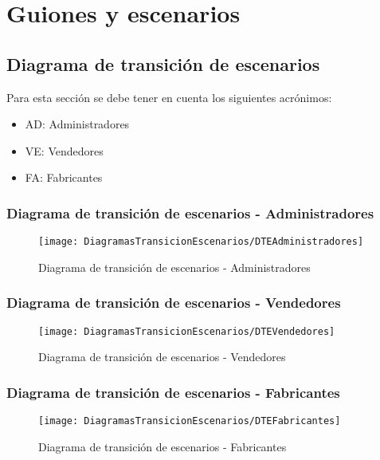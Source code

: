\section{Guiones y escenarios}
\subsection{Diagrama de transición de escenarios}
Para esta sección se debe tener en cuenta los siguientes acrónimos:
\begin{itemize}
    \item AD: Administradores
    \item VE: Vendedores
    \item FA: Fabricantes
\end{itemize}
\subsubsection{Diagrama de transición de escenarios - Administradores}
    \begin{figure}[H]
        \centering
        \texttt{[image: DiagramasTransicionEscenarios/DTEAdministradores]}
        \caption{Diagrama de transición de escenarios - Administradores}
    \label{fig:DTEAdministradores}
\end{figure}
\subsubsection{Diagrama de transición de escenarios - Vendedores}
\begin{figure}[H]
    \centering
    \texttt{[image: DiagramasTransicionEscenarios/DTEVendedores]}
    \caption{Diagrama de transición de escenarios - Vendedores}
\label{fig:DTEVendedores}
\end{figure}
\subsubsection{Diagrama de transición de escenarios - Fabricantes}
\begin{figure}[H]
    \centering
    \texttt{[image: DiagramasTransicionEscenarios/DTEFabricantes]}
    \caption{Diagrama de transición de escenarios - Fabricantes}
\label{fig:DTEFabricantes}
\end{figure}